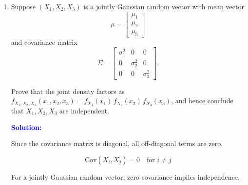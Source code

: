 \documentclass[11pt]{article}
\newcommand{\solution}{
    \vspace{0.3cm}
    \noindent\textbf{\textcolor{blue}{Solution:}}
    \vspace{0.3cm}
}
\begin{document}
\begin{enumerate}[label=\textbf{Question-\arabic*:}, leftmargin=*]
\[\[\[
\mu_X\mu_X^T =
\begin{bmatrix}2\\-1\\1\end{bmatrix}
\begin{bmatrix}2&-1&1\end{bmatrix}
=
\begin{bmatrix}4&-2&2\\-2&1&-1\\2&-1&1\end{bmatrix}
\]

Add:

\[
R_{XX} =
\begin{bmatrix}3&1&-1\\1&4&2\\-1&2&5\end{bmatrix}
+
\begin{bmatrix}4&-2&2\\-2&1&-1\\2&-1&1\end{bmatrix}
=
\begin{bmatrix}7&-1&1\\-1&5&1\\1&1&6\end{bmatrix}
\]

\newpage

\item Suppose $(X_1, X_2, X_3)$ is a jointly Gaussian random vector with mean vector
\[
\mu =
\begin{bmatrix}\mu_1\\\mu_2\\\mu_3\end{bmatrix}
\]
and covariance matrix
\[
\Sigma =
\begin{bmatrix}\sigma_1^2&0&0\\0&\sigma_2^2&0\\0&0&\sigma_3^2\end{bmatrix}.
\]

Prove that the joint density factors as $f_{X_1,X_2,X_3}(x_1,x_2,x_3) = f_{X_1}(x_1)\,f_{X_2}(x_2)\,f_{X_3}(x_3)$, and hence conclude that $X_1, X_2, X_3$ are independent.

\solution

Since the covariance matrix is diagonal, all off-diagonal terms are zero.

\[
\text{Cov}(X_i, X_j) = 0 \quad \text{for } i \neq j
\]

For a jointly Gaussian random vector, zero covariance implies independence.

\]\]
\end{enumerate}
\end{document}
